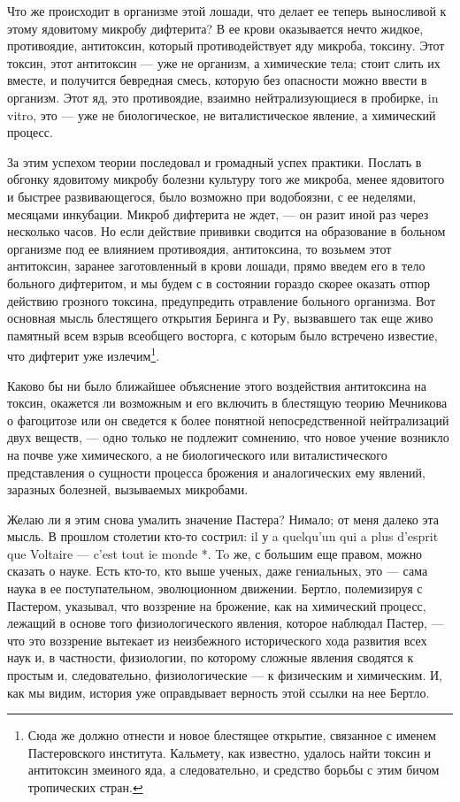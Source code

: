 Что  же происходит  в  организме  этой лошади,  что  делает ее  теперь
выносливой к этому ядовитому микробу дифтерита? В ее крови оказывается
нечто  жидкое, противоядие,  антитоксин, который  противодействует яду
микроба, токсину.  Этот токсин, этот  антитоксин --- уже  не организм,
а  химические  тела; стоит  слить  их  вместе, и  получится  бевредная
смесь, которую  без опасности  можно ввести в  организм. Этот  яд, это
противоядие,  взаимно  нейтрализующиеся  в  пробирке,  in  vitro,  это
---  уже не  биологическое, не  виталистическое явление,  а химический
процесс.

За этим успехом теории последовал  и громадный успех практики. Послать
в обгонку  ядовитому микробу болезни  культуру того же  микроба, менее
ядовитого и быстрее развивающегося, было возможно при водобоязни, с ее
неделями, месяцами инкубации.  Микроб дифтерита не ждет,  --- он разит
иной раз  через несколько  часов. Но  если действие  прививки сводится
на  образование  в  больном  организме под  ее  влиянием  противоядия,
антитоксина,  то  возьмем  этот антитоксин,  заранее  заготовленный  в
крови  лошади, прямо  введем  его  в тело  больного  дифтеритом, и  мы
будем с  в состоянии  гораздо скорее  оказать отпор  действию грозного
токсина,  предупредить  отравление  больного организма.  Вот  основная
мысль  блестящего  открытия Беринга  и  Ру,  вызвавшего так  еще  живо
памятный  всем  взрыв всеобщего  восторга,  с  которым было  встречено
известие, что  дифтерит уже излечим\footnote{Сюда же  должно отнести и
новое блестящее открытие, связанное  с именем Пастеровского института.
Кальмету,  как известно,  удалось найти  токсин и  антитоксин змеиного
яда,  а следовательно,  и  средство борьбы  с  этим бичом  тропических
стран.}.


Каково бы  ни было ближайшее объяснение  этого воздействия антитоксина
на  токсин,  окажется   ли  возможным  и  его   включить  в  блестящую
теорию  Мечникова  о  фагоцитозе  или он  сведется  к  более  понятной
непосредственной  нейтрализаций  двух  веществ,  ---  одно  только  не
подлежит сомнению, что новое учение возникло на почве уже химического,
а  не биологического  или  виталистического  представления о  сущности
процесса  брожения и  аналогических  ему  явлений, заразных  болезней,
вызываемых микробами.

Желаю ли я этим снова умалить значение Пастера? Нимало; от меня далеко
эта мысль. В  прошлом столетии кто-то сострил: il у  a quelqu'un qui a
plus  d'esprit que  Voltaire  --- c'est  tout  ie monde  *.  To же,  с
большим  еще правом,  можно сказать  о  науке. Есть  кто-то, кто  выше
ученых,  даже гениальных,  это  --- сама  наука  в ее  поступательном,
эволюционном движении.  Бертло, полемизируя с Пастером,  указывал, что
воззрение на  брожение, как  на химический  процесс, лежащий  в основе
того физиологического  явления, которое  наблюдал Пастер, ---  что это
воззрение  вытекает из  неизбежного исторического  хода развития  всех
наук и, в частности, физиологии,  по которому сложные явления сводятся
к  простым  и,  следовательно,  физиологические  ---  к  физическим  и
химическим. И,  как мы  видим, история  уже оправдывает  верность этой
ссылки на нее Бертло.

